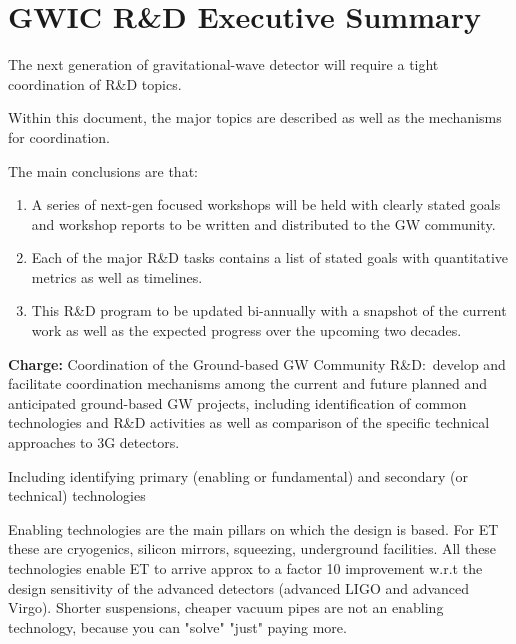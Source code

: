 \chapter{GWIC R\&D Executive Summary}
\label{sec:Exec}


The next generation of gravitational-wave detector will require a tight coordination of R\&D topics.

Within this document, the major topics are described as well as the mechanisms for coordination.

The main conclusions are that:
\begin{enumerate}
\item A series of next-gen focused workshops will be held with clearly stated goals and workshop reports to be written and distributed to the GW community.

\item Each of the major R\&D tasks contains a list of stated goals with quantitative metrics as well as timelines.

\item This R\&D program to be updated bi-annually with a snapshot of the current work as well as the expected progress over the upcoming two decades. 
\end{enumerate}

\textbf{Charge:} Coordination of the Ground-based GW Community R\&D:~develop and facilitate coordination mechanisms among the current and future planned and anticipated ground-based GW projects, including identification of common technologies and R\&D activities as well as comparison of the specific technical approaches to 3G detectors.

Including identifying primary (enabling or fundamental) and secondary (or technical) technologies \\


\noindent 

\noindent Enabling technologies are the main pillars on which the design is based. For ET these are cryogenics, silicon mirrors, squeezing, underground facilities. All these technologies enable ET to arrive approx to a factor 10 improvement w.r.t the design sensitivity of the advanced detectors (advanced LIGO and advanced Virgo). Shorter suspensions, cheaper vacuum pipes are not an enabling technology, because you can "solve" "just" paying more.\\

